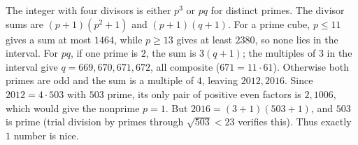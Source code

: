 The integer with four divisors is either $ p^3 $ or $ pq $ for distinct primes. The divisor sums are $(p+1)(p^2+1)$ and $(p+1)(q+1)$. For a prime cube, $ p\le11 $ gives a sum at most $ 1464 $, while $ p\ge13 $ gives at least $ 2380 $, so none lies in the interval. For $ pq $, if one prime is $ 2 $, the sum is $ 3(q+1)$; the multiples of $ 3 $ in the interval give $ q=669,670,671,672 $, all composite ($ 671=11\cdot61 $). Otherwise both primes are odd and the sum is a multiple of $ 4 $, leaving $ 2012,2016 $. Since $ 2012=4\cdot503 $ with $ 503 $ prime, its only pair of positive even factors is $ 2,1006 $, which would give the nonprime $ p=1 $. But $ 2016=(3+1)(503+1)$, and $ 503 $ is prime (trial division by primes through $\sqrt{503}<23 $ verifies this). Thus exactly $\boxed1 $ number is nice.
